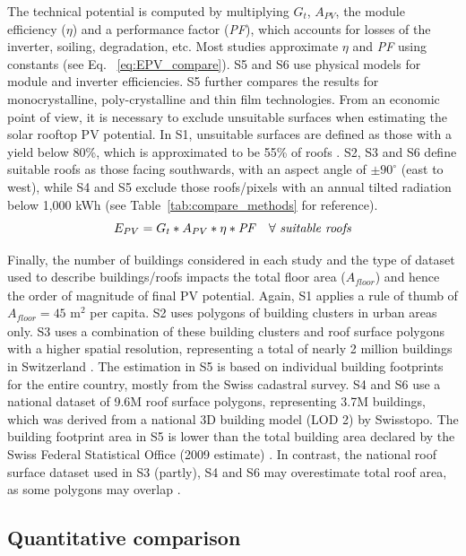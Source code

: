 The technical potential is computed by multiplying $G_t$, $A_{PV}$, the module efficiency ($\eta$) and a performance factor (\textit{PF}), which accounts for losses of the inverter, soiling, degradation, etc. Most studies approximate $\eta$ and \textit{PF} using constants (see Eq. ~\ref{eq:EPV_compare}). S5 and S6 use physical models for module and inverter efficiencies. S5 further compares the results for monocrystalline, poly-crystalline and thin film technologies. From an economic point of view, it is necessary to exclude unsuitable surfaces when estimating the solar rooftop PV potential. In S1, unsuitable surfaces are defined as those with a yield below 80\%, which is approximated to be 55\% of roofs \cite{iea_potential_2002}. S2, S3 and S6 define suitable roofs as those facing southwards, with an aspect angle of $\pm 90^\circ$ (east to west), while S4 and S5 exclude those roofs/pixels with an annual tilted radiation below 1,000 kWh (see Table~\ref{tab:compare_methods} for reference).
\begin{equation}
\label{eq:EPV_compare}
    E_{PV} = G_t * A_{PV} * \eta * \mathit{PF} \quad \forall \ \text{\textit{suitable roofs}}
\end{equation}

Finally, the number of buildings considered in each study and the type of dataset used to describe buildings/roofs impacts the total floor area ($A_{\mathit{floor}}$) and hence the order of magnitude of final PV potential. Again, S1 applies a rule of thumb of $A_{\mathit{floor}} = 45$ m$^2$ per capita. S2 uses polygons of building clusters in urban areas only. S3 uses a combination of these building clusters and roof surface polygons with a higher spatial resolution, representing a total of nearly 2 million buildings in Switzerland \cite{assouline_large-scale_2018}. The estimation in S5 is based on individual building footprints for the entire country, mostly from the Swiss cadastral survey. S4 and S6 use a national dataset of 9.6M roof surface polygons, representing 3.7M buildings, which was derived from a national 3D building model (LOD 2) by Swisstopo. The building footprint area in S5 is lower than the total building area declared by the Swiss Federal Statistical Office (2009 estimate) \cite{buffat_scalable_2018}. In contrast, the national roof surface dataset used in S3 (partly), S4 and S6 may overestimate total roof area, as some polygons may overlap \cite{swisstopo_swisstlm3d_2018}.

\subsection{Quantitative comparison}

